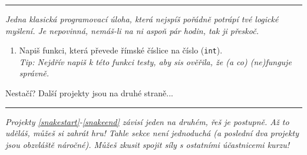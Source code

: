 \documentclass[a4paper,10pt]{article}
\newcommand\startsection[1]{
     \vspace{0.2ex}
    \hrule
    {\fontspec{Oxygen} \tiny
     \vspace{-1ex}
     \emph{#1}
     \vspace{-1.5em}
    }
}
\begin{document}
\startsection{Jedna klasická programovací úloha, která nejspíš pořádně potrápí
    tvé logické myšlení. Je nepovinná, nemáš-li na ni aspoň pár hodin,
    tak ji přeskoč.}

\begin{enumerate}[resume]

\item Napiš funkci, která převede římské číslice na číslo (\verb+int+).
    \\\emph{Tip: Nejdřív napiš k této funkci testy, aby sis
        ověřila, že (a co) (ne)funguje správně.}

\end{enumerate}

\vfill

\hfill { \tiny Nestačí? Další projekty jsou na druhé straně...}
\newpage

\startsection{Projekty \ref{snakestart}-\ref{snakeend} závisí jeden na druhém,
    řeš je postupně. Až to uděláš, můžeš si zahrát hru!
    Tahle sekce není jednoduchá (a poslední dva projekty jsou obzvláště náročné).
    Můžeš zkusit spojit síly s ostatními účastnicemi kurzu!}
\end{document}
